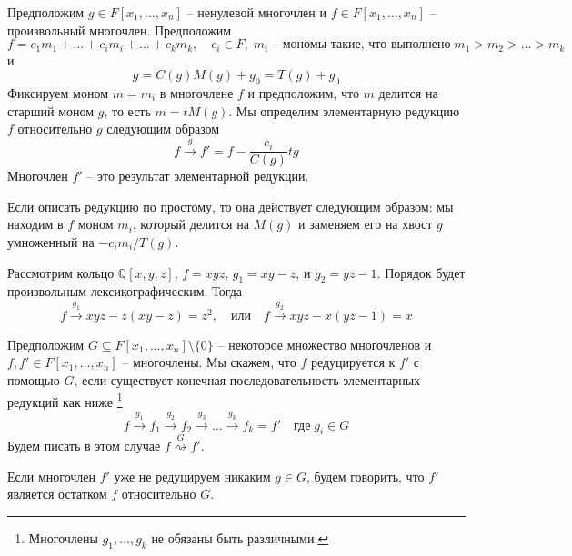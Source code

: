 \begin{definition}
\label{def::ElementaryReduction}
Предположим $g\in F[x_1,\ldots,x_n]$ -- ненулевой многочлен и $f\in F[x_1,\ldots,x_n]$ -- произвольный многочлен.
Предположим
\[
f= c_1m_1 + \ldots + c_i m_i + \ldots + c_k m_k,\quad c_i\in F,\;m_i\;\text{-- мономы такие, что выполнено}\; m_1 > m_2 >\ldots>m_k
\]
и
\[
g = C(g) M(g) + g_0 = T(g) + g_0
\]
Фиксируем моном $m = m_i$ в многочлене $f$ и предположим, что $m$ делится на старший моном $g$, то есть $m = t M(g)$.
Мы определим элементарную редукцию $f$ относительно $g$ следующим образом
\[
f\stackrel{g}{\longrightarrow} f' = f - \frac{c_i}{C(g)}t g
\]
Многочлен $f'$ -- это результат элементарной редукции.
\end{definition}

Если описать редукцию по простому, то она действует следующим образом: мы находим в $f$ моном $m_i$, который делится на $M(g)$ и заменяем его на хвост $g$ умноженный на $- c_i m_i / T(g)$.

\begin{example}
Рассмотрим кольцо $\mathbb Q[x, y, z]$, $f = xyz$, $g_1 = xy - z$, и $g_2 = yz - 1$.
Порядок будет произвольным лексикографическим.
Тогда
\[
f\stackrel{g_1}{\longrightarrow} xyz - z(xy - z) = z^2,
\quad\text{или}\quad
f\stackrel{g_2}{\longrightarrow} xyz - x(yz - 1) = x
\]
\end{example}

\begin{definition}
\label{def::ReductionRem}
Предположим $G\subseteq F[x_1,\ldots,x_n]\setminus \{0\}$ -- некоторое множество многочленов и $f, f'\in F[x_1,\ldots,x_n]$ -- многочлены.
Мы скажем, что $f$ редуцируется к $f'$ с помощью $G$, если существует конечная последовательность элементарных редукций как ниже%
\footnote{Многочлены $g_1,\ldots,g_k$ не обязаны быть различными.}
\[
f\stackrel{g_1}{\longrightarrow}f_1\stackrel{g_2}{\longrightarrow}f_2\stackrel{g_3}{\longrightarrow}\ldots \stackrel{g_k}{\longrightarrow}f_k = f'\quad\text{где}\;g_i \in G
\]
Будем писать в этом случае $f\stackrel{G}{\rightsquigarrow} f'$.

Если многочлен $f'$ уже не редуцируем никаким $g\in G$, будем говорить, что $f'$ является остатком $f$ относительно $G$.
\end{definition}

